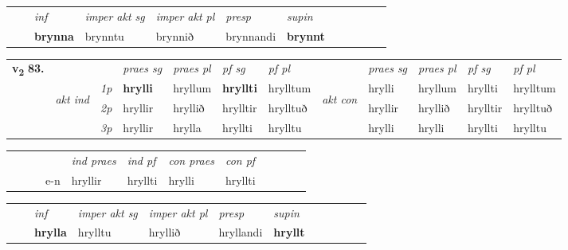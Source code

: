 \begin{tabular}{llllllllllll}
 & & \textit{inf} & \textit{imper akt sg} & \textit{imper akt pl}   & \textit{presp} & \textit{supin}       \\*
  & & \textbf{brynna} & brynntu  & brynnið   & brynnandi &  \textbf{brynnt}   \\*
\cmidrule{1-12}
\end{tabular}



\begin{tabular}{llllllllllll} \toprule
\multirow{4}{*}{{{\textbf{v{\textsubscript{2}}} \Large{\textbf{83.}}}}}  & &   &  \textit{praes sg}  & \textit{praes pl}  &\textit{ pf sg} & \textit{pf pl} &  &  \textit{praes sg}  & \textit{praes pl}  & \textit{pf sg} & \textit{pf pl } \\*
	\cmidrule{4-7} \cmidrule{9-12}
 & \multirow{3}{*}{\begin{turn}{90}\textit{akt ind}\end{turn}} & {\textit{1p}} & \textbf{hrylli} & hryllum    & \textbf{hryllti} & hrylltum & \multirow{3}{*}{\begin{turn}{90}\textit{akt con}\end{turn}} &hrylli & hryllum & hryllti & hrylltum\\*
& &  {\textit{2p}} &  hryllir  & hryllið   & hrylltir & hrylltuð & & hryllir & hryllið & hrylltir & hrylltuð \\*
& &  {\textit{3p}} & hryllir & hrylla   & hryllti & hrylltu & & hrylli & hrylli& hryllti & hrylltu  \\*
\cmidrule{4-7} \cmidrule{9-12}
\end{tabular}


\begin{tabular}{llllllllllll}
 & &  & &  \textit{ind praes} & \textit{ind pf} & \textit{con praes} & \textit{con pf} \\*
&  & & e-n & hryllir & hryllti & hrylli & hryllti \\*
\cmidrule{5-9}
\end{tabular}


\begin{tabular}{llllllllllll}
 & & \textit{inf} & \textit{imper akt sg} & \textit{imper akt pl}   & \textit{presp} & \textit{supin}       \\*
  & & \textbf{hrylla} & hrylltu  & hryllið   & hryllandi &  \textbf{hryllt}   \\*
\cmidrule{1-12}
\end{tabular}



